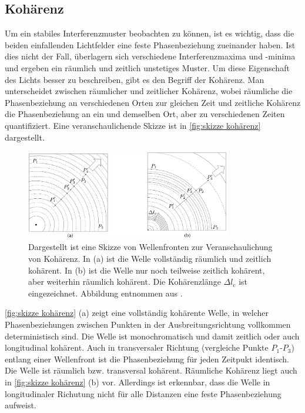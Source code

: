 \subsection{Kohärenz}
\label{ssec:Kohärenz}
Um ein stabiles Interferenzmuster beobachten zu können, ist es wichtig, dass die beiden einfallenden Lichtfelder eine feste Phasenbeziehung zueinander haben. 
Ist dies nicht der Fall, überlagern sich verschiedene Interferenzmaxima und -minima und ergeben ein räumlich und zeitlich unstetiges Muster. 
Um diese Eigenschaft des Lichts besser zu beschreiben, gibt es den Begriff der Kohärenz.
Man unterscheidet zwischen räumlicher und zeitlicher Kohärenz, wobei räumliche die Phasenbeziehung an verschiedenen Orten zur gleichen Zeit und zeitliche Kohärenz die Phasenbeziehung an ein und demselben Ort, aber zu verschiedenen Zeiten quantifiziert. \cite[Kap. 9.2]{hechtOptik2018}
Eine veranschaulichende Skizze ist in \autoref{fig:skizze kohärenz} dargestellt.
\begin{figure}[h]
    \centering
    \includegraphics[width=0.8\textwidth]{images/Theorie/Hecht_9.6.png}
    \caption{Dargestellt ist eine Skizze von Wellenfronten zur Veranschaulichung von Kohärenz. In (a) ist die Welle vollständig räumlich und zeitlich kohärent. In (b) ist die Welle nur noch teilweise zeitlich kohärent, aber weiterhin räumlich kohärent. Die Kohärenzlänge $\Delta l_\mathrm{c}$ ist eingezeichnet. Abbildung entnommen aus \cite{hechtOptik2018}.}
    \label{fig:skizze kohärenz}
\end{figure}
\autoref{fig:skizze kohärenz} (a) zeigt eine vollständig kohärente Welle, in welcher Phasenbeziehungen zwischen Punkten in der Ausbreitungsrichtung vollkommen deterministisch sind. 
Die Welle ist monochromatisch und damit zeitlich oder auch longitudinal kohärent. 
Auch in transversaler Richtung (vergleiche Punkte $P_1$-$P_3$) entlang einer Wellenfront ist die Phasenbeziehung für jeden Zeitpukt identisch. 
Die Welle ist räumlich bzw. transversal kohärent. 
Räumliche Kohärenz liegt auch in \autoref{fig:skizze kohärenz} (b) vor. 
Allerdings ist erkennbar, dass die Welle in longitudinaler Richutung nicht für alle Distanzen eine feste Phasenbeziehung aufweist. 
